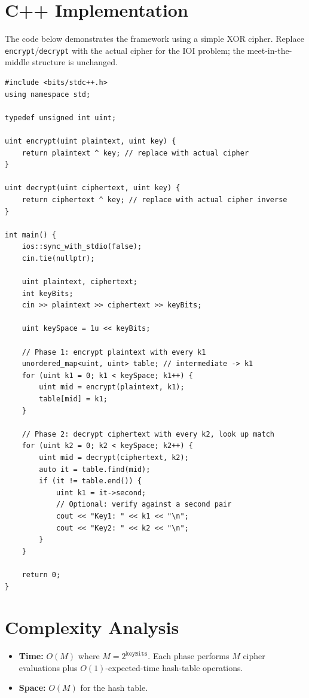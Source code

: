 \documentclass[11pt,a4paper]{article}
\begin{document}
\section{C++ Implementation}

The code below demonstrates the framework using a simple XOR cipher.
Replace \texttt{encrypt}/\texttt{decrypt} with the actual cipher for the
IOI problem; the meet-in-the-middle structure is unchanged.

\begin{lstlisting}
#include <bits/stdc++.h>
using namespace std;

typedef unsigned int uint;

uint encrypt(uint plaintext, uint key) {
    return plaintext ^ key; // replace with actual cipher
}

uint decrypt(uint ciphertext, uint key) {
    return ciphertext ^ key; // replace with actual cipher inverse
}

int main() {
    ios::sync_with_stdio(false);
    cin.tie(nullptr);

    uint plaintext, ciphertext;
    int keyBits;
    cin >> plaintext >> ciphertext >> keyBits;

    uint keySpace = 1u << keyBits;

    // Phase 1: encrypt plaintext with every k1
    unordered_map<uint, uint> table; // intermediate -> k1
    for (uint k1 = 0; k1 < keySpace; k1++) {
        uint mid = encrypt(plaintext, k1);
        table[mid] = k1;
    }

    // Phase 2: decrypt ciphertext with every k2, look up match
    for (uint k2 = 0; k2 < keySpace; k2++) {
        uint mid = decrypt(ciphertext, k2);
        auto it = table.find(mid);
        if (it != table.end()) {
            uint k1 = it->second;
            // Optional: verify against a second pair
            cout << "Key1: " << k1 << "\n";
            cout << "Key2: " << k2 << "\n";
        }
    }

    return 0;
}
\end{lstlisting}

\section{Complexity Analysis}
\begin{itemize}
  \item \textbf{Time:} $O(M)$ where $M = 2^{\texttt{keyBits}}$.
        Each phase performs $M$ cipher evaluations plus $O(1)$-expected-time
        hash-table operations.
  \item \textbf{Space:} $O(M)$ for the hash table.
\end{itemize}
\end{document}
